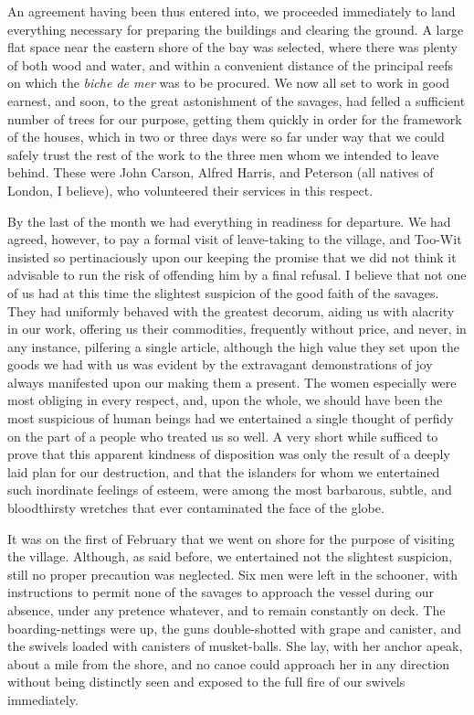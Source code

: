 An agreement having been thus entered into, we proceeded immediately to land
everything necessary for preparing the buildings and clearing the ground. A
large flat space near the eastern shore of the bay was selected, where there was
plenty of both wood and water, and within a convenient distance of the principal
reefs on which the \emph{biche de mer} was to be procured. We now all set to
work in good earnest, and soon, to the great astonishment of the savages, had
felled a sufficient number of trees for our purpose, getting them quickly in
order for the framework of the houses, which in two or three days were so far
under way that we could safely trust the rest of the work to the three men whom
we intended to leave behind. These were John Carson, Alfred Harris, and Peterson
(all natives of London, I believe), who volunteered their services in this
respect. 

By the last of the month we had everything in readiness for departure. We had
agreed, however, to pay a formal visit of leave-taking to the village, and
Too-Wit insisted so pertinaciously upon our keeping the promise that we did not
think it advisable to run the risk of offending him by a final refusal. I
believe that not one of us had at this time the slightest suspicion of the good
faith of the savages. They had uniformly behaved with the greatest decorum,
aiding us with alacrity in our work, offering us their commodities, frequently
without price, and never, in any instance, pilfering a single article, although
the high value they set upon the goods we had with us was evident by the
extravagant demonstrations of joy always manifested upon our making them a
present. The women especially were most obliging in every respect, and, upon the
whole, we should have been the most suspicious of human beings had we
entertained a single thought of perfidy on the part of a people who treated us
so well. A very short while sufficed to prove that this apparent kindness of
disposition was only the result of a deeply laid plan for our destruction, and
that the islanders for whom we entertained such inordinate feelings of esteem,
were among the most barbarous, subtle, and bloodthirsty wretches that ever
contaminated the face of the globe. 

It was on the first of February that we went on shore for the purpose of
visiting the village. Although, as said before, we entertained not the slightest
suspicion, still no proper precaution was neglected. Six men were left in the
schooner, with instructions to permit none of the savages to approach the vessel
during our absence, under any pretence whatever, and to remain constantly on
deck. The boarding-nettings were up, the guns double-shotted with grape and
canister, and the swivels loaded with canisters of musket-balls. She lay, with
her anchor apeak, about a mile from the shore, and no canoe could approach her
in any direction without being distinctly seen and exposed to the full fire of
our swivels immediately. 

